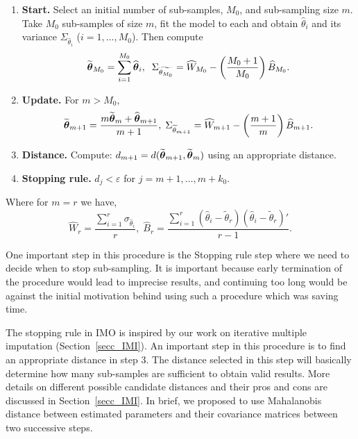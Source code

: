 \documentclass[11pt,a5paper,twoside]{book}
\newcommand{\bftheta}{\mbox{\boldmath $\theta$}}
\begin{document}
\begin{enumerate}
\item \textbf{Start.} Select an initial number of sub-samples, $M_0$, and sub-sampling size $m$. Take $M_0$ sub-samples of size $m$, fit the model to each and obtain $\widehat{\theta}_i$ and its variance $\Sigma_{\widehat{\theta}_i}$ ($i=1,\ldots,M_0$). Then compute 
\begin{equation}
\label{comb_rules}
\widetilde{\bftheta}_{M_0} = \sum_{i=1}^{M_0} \widehat{\bftheta}_i,\;\; \Sigma_{\widetilde{\theta_{M_0}}}=\widehat{W}_{M_0} - \left( \frac{M_0+1}{M_0} \right) \widehat{B}_{M_0}.
\end{equation}

			\item \textbf{Update.} For $m>M_0$, \begin{equation}
	\label{imointroupdate}
	\widetilde{{\bftheta}}_{m+1}=\frac{m\widetilde{\bftheta}_m + \widehat{\bftheta}_{m+1}}{m+1},\; \Sigma_{\widetilde{\theta}_{m+1}}=\widehat{W}_{m+1} - \left( \frac{m+1}{m} \right) \widehat{B}_{m+1}.
	\end{equation}
	\item \textbf{Distance.} Compute: $d_{m+1}=d(\widetilde{\bftheta}_{m+1},\widetilde{\bftheta}_{m})$ using an appropriate distance.
	\item \textbf{Stopping rule.} $d_{j} < \varepsilon$ for $j=m+1,\ldots,m+k_0$.
\end{enumerate}
Where for $m=r$ we have,
\begin{equation}
\widehat{W}_r= \frac{\sum_{i=1}^r \sigma_{\widehat{\theta}_i}}{r},\; \widehat{B}_r= \frac{\sum_{i=1}^r (\widehat{\theta}_i - \widetilde{\theta}_r)(\widehat{\theta}_i - \widetilde{\theta}_r)'}{r-1}.
\end{equation}

One important step in this procedure is the Stopping rule step where we need to decide when to stop sub-sampling. It is important because early termination of the procedure would lead to imprecise results, and continuing too long would be against the initial motivation behind using such a procedure which was saving time. 

The stopping rule in IMO is inspired by our work on iterative multiple imputation (Section~\ref{secc_IMI}). An important step in this procedure is to find an appropriate distance in step 3. The distance selected in this step will basically determine how many sub-samples are sufficient to obtain valid results. More details on different possible candidate distances and their pros and cons are discussed in Section~\ref{secc_IMI}. In brief, we proposed to use Mahalanobis distance \citep{mahalanobis1936} between estimated parameters and their covariance matrices between two successive steps. 
\end{document}
